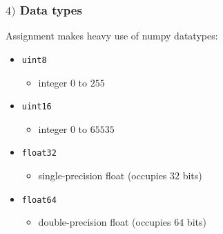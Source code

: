 \documentclass[english,14pt]{beamer}
\begin{document}
\begin{frame}[fragile]

\frametitle{$4)$ Data types}

Assignment makes heavy use of numpy datatypes:
\vspace*{5mm}
\begin{itemize}
	\item \texttt{uint8}
	\begin{itemize}
		\item integer $0$ to $255$
	\end{itemize}
	\item \texttt{uint16}
	\begin{itemize}
		\item integer $0$ to $65535$
	\end{itemize}
	\item \texttt{float32}
	\begin{itemize}
		\item single-precision float (occupies $32$ bits)
	\end{itemize}
	\item \texttt{float64}
	\begin{itemize}
		\item double-precision float (occupies $64$ bits)
	\end{itemize}
		
\end{itemize}

\end{frame}

\end{document}
